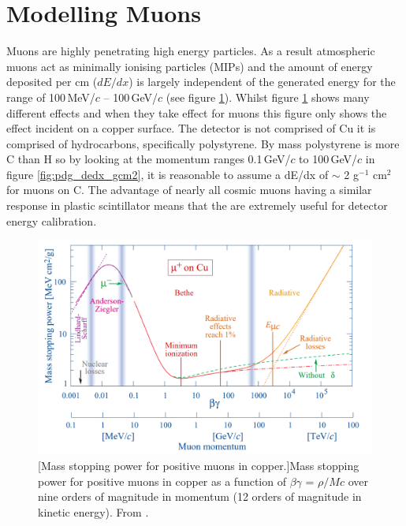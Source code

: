 \clearpage
\section{Modelling Muons}
Muons are highly penetrating high energy particles. As a result atmospheric muons act as minimally ionising particles (MIPs) and the amount of energy deposited per cm ($dE/dx$) is largely independent of the generated energy for the range of 100\,MeV/$c$ -- 100\,GeV/$c$ (see figure \ref{fig:pdg_MuonMomentumStopping}). Whilst figure \ref{fig:pdg_MuonMomentumStopping} shows many different effects and when they take effect for muons this figure only shows the effect incident on a copper surface. The detector is not comprised of Cu it is comprised of hydrocarbons, specifically polystyrene. By mass polystyrene is more C than H so by looking at the momentum ranges 0.1\,GeV/$c$ to 100\,GeV/$c$ in figure \ref{fig:pdg_dedx_gcm2}, it is reasonable to assume a dE/dx of $\sim$ 2 g$^{-1}$ cm$^2$ for muons on C. The advantage of nearly all cosmic muons having a similar response in plastic scintillator means that the are extremely useful for detector energy calibration. 

\begin{figure}[!h]
 \centering
 \includegraphics[width=0.7\linewidth]{Chapter4/Figs/Raster/pdg_MuonMomentumStopping.png}
 [Mass stopping power for positive muons in copper.]{Mass stopping power for positive muons in copper as a function of $\beta \gamma$ = $\rho/Mc$ over nine orders of magnitude in momentum (12 orders of magnitude in kinetic energy). From \cite{Olive_2014}.} 
 \label{fig:pdg_MuonMomentumStopping}
\end{figure}

